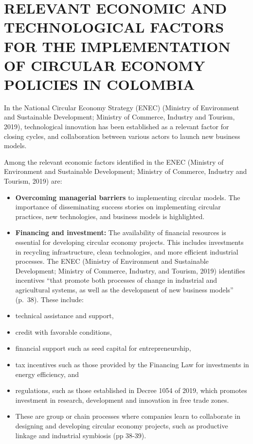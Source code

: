 \documentclass[
  12pt,
  oneside]{book}
\providecommand{\tightlist}{%
  \setlength{\itemsep}{0pt}\setlength{\parskip}{0pt}}
\begin{document}
\section{RELEVANT ECONOMIC AND TECHNOLOGICAL FACTORS FOR THE
IMPLEMENTATION OF CIRCULAR ECONOMY POLICIES IN
COLOMBIA}\label{relevant-economic-and-technological-factors-for-the-implementation-of-circular-economy-policies-in-colombia}

In the National Circular Economy Strategy (ENEC) (Ministry of
Environment and Sustainable Development; Ministry of Commerce, Industry
and Tourism, 2019), technological innovation has been established as a
relevant factor for closing cycles, and collaboration between various
actors to launch new business models.

Among the relevant economic factors identified in the ENEC (Ministry of
Environment and Sustainable Development; Ministry of Commerce, Industry
and Tourism, 2019) are:

\begin{itemize}
\tightlist
\item
  \textbf{Overcoming managerial barriers }to implementing circular
  models. The importance of disseminating success stories on
  implementing circular practices, new technologies, and business models
  is highlighted.
\item
  \textbf{Financing and investment: }The availability of financial
  resources is essential for developing circular economy projects. This
  includes investments in recycling infrastructure, clean technologies,
  and more efficient industrial processes. The ENEC (Ministry of
  Environment and Sustainable Development; Ministry of Commerce,
  Industry, and Tourism, 2019) identifies incentives ``that promote both
  processes of change in industrial and agricultural systems, as well as
  the development of new business models'' (p.~38). These include:
\item
  technical assistance and support,
\item
  credit with favorable conditions,
\item
  financial support such as seed capital for entrepreneurship,
\item
  tax incentives such as those provided by the Financing Law for
  investments in energy efficiency, and
\item
  regulations, such as those established in Decree 1054 of 2019, which
  promotes investment in research, development and innovation in free
  trade zones.
\item
  These are group or chain processes where companies learn to
  collaborate in designing and developing circular economy projects,
  such as productive linkage and industrial symbiosis (pp 38-39).
\end{itemize}
\end{document}
